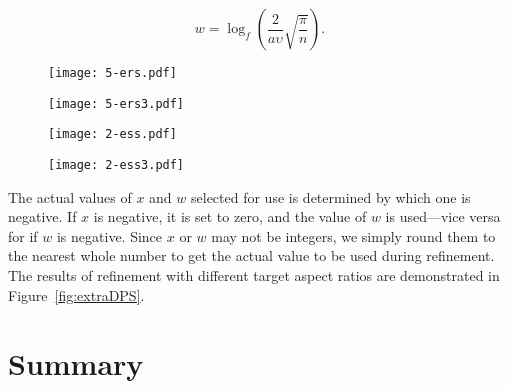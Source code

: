 \begin{equation}
w = \log_{f} \left( \frac{2}{a \upsilon} \sqrt{ \frac{\pi}{n}} \right).
\label{eq:num2D}
\end{equation}


\begin{figure*}[h]
	\centering
	\begin{subfigure}[]{0.25\textwidth}
		\centering
		\texttt{[image: 5-ers.pdf]}
		\caption{}
		\label{fig:ers1}
	\end{subfigure}%
	\begin{subfigure}[]{0.25\textwidth}
		\centering
		\texttt{[image: 5-ers3.pdf]}
		\caption{}
		\label{fig:ers3}
	\end{subfigure}%
	\begin{subfigure}[]{0.25\textwidth}
		\centering
		\texttt{[image: 2-ess.pdf]}
		\caption{}
		\label{fig:ess1}
	\end{subfigure}%
	\begin{subfigure}[]{0.25\textwidth}
		\centering
		\texttt{[image: 2-ess3.pdf]}
		\caption{}
		\label{fig:ess3}
	\end{subfigure}
	
	\caption{A demonstration of how refinement can be modified to affect the aspect ratio of cells.
		All figures show a starting pyramid cell from a grid with 200 cells in its initial discretization.
		Central layer with five extra radial splits ($a = 3$ to get $x = 5$) at \textbf{(a)} one level of refinement and \textbf{(b)} three levels.
		Central layer with two applications of the surface refinement scheme ($a = 1/8$ to get $w = 2$) at \textbf{(c)} one level of refinement and \textbf{(d)} three levels}
	\label{fig:extraDPS}
\end{figure*}


The actual values of $x$ and $w$ selected for use is determined by which one is negative.
If $x$ is negative, it is set to zero, and the value of $w$ is used---vice versa for if $w$ is negative.
Since $x$ or $w$ may not be integers, we simply round them to the nearest whole number to get the actual value to be used during refinement.
The results of refinement with different target aspect ratios are demonstrated in Figure~\ref{fig:extraDPS}.

\section{Summary}